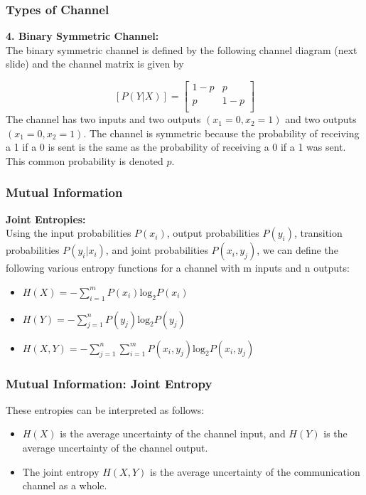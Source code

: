 \documentclass[a4]{beamer}
\begin{document}

\frametitle{Types of Channel}
\textbf{4. Binary Symmetric Channel:}\\
The binary symmetric channel is defined by the following channel diagram (next slide) and the channel matrix is given by

\[  [P(Y|X)]  = \left[ \begin{array}{cc}
1-p & p  \\
p & 1-p\\
\end{array} \right] \]
The channel has two inputs and two outputs $(x_1=0,x_2=1)$ and two outputs $(x_1=0,x_2=1)$. The channel is symmetric because the probability of receiving a 1 if a 0 is sent is the same as the probability of receiving a 0 if a 1 was sent. This common probability is denoted $p$.




\frametitle{Mutual Information}
\textbf{Joint Entropies:}\\
Using the input probabilities $P(x_i)$, output probabilities $P(y_i)$, transition probabilities $P(y_i|x_i)$,
and joint probabilities $P(x_i,y_j)$, we can define the following various entropy functions for a channel
with m inputs and n outputs:

\begin{itemize}
\item $H(X) = - \sum ^{m}_{i=1} P(x_i) \mbox{log}_2 P(x_i)$%
\item $H(Y) = - \sum ^{n}_{j=1} P(y_j) \mbox{log}_2 P(y_j)$
\item $H(X, Y)= - \sum ^{n}_{j=1}\sum ^{m}_{i=1} P(x_i,y_j) \mbox{log}_2 P(x_i,y_j)$
\end{itemize}



\frametitle{Mutual Information: Joint Entropy}
These entropies can be interpreted as follows:\begin{itemize}\item $ H(X)$ is the average uncertainty of the channel input,
and $H(Y)$ is the average uncertainty of the channel output.\item  The joint entropy $H(X,Y)$ is the average uncertainty of the communication channel as a
whole.\end{itemize}
\end{document}
